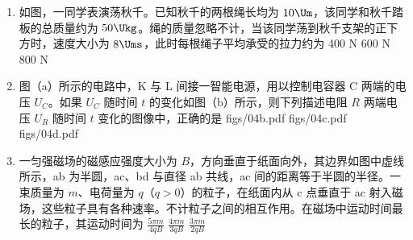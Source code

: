 \documentclass[\gkver]{gaokaozhenti}
\begin{document}
\begin{enumerate}
{故选 B。
}

\item
如图，一同学表演荡秋千。已知秋千的两根绳长均为 $10\Um$，该同学和秋千踏板的总质量约为 $50\Ukg$。绳的质量忽略不计，当该同学荡到秋千支架的正下方时，速度大小为 $8\Ums$，此时每根绳子平均承受的拉力约为
{400 N}
{600 N}
{800 N}

\item
图（a）所示的电路中，K 与 L 间接一智能电源，用以控制电容器 C 两端的电压 $U_{C}$。如果 $U_{C}$ 随时间 $t$ 的变化如图（b）所示，则下列描述电阻 $R$ 两端电压 $U_{R}$ 随时间 $t$ 变化的图像中，正确的是
\onepicture[w=11.00cm]{}
{figs/04b.pdf}
{figs/04c.pdf}
{figs/04d.pdf}

\item
一匀强磁场的磁感应强度大小为 $B$，方向垂直于纸面向外，其边界如图中虚线所示，ab 为半圆，ac、bd 与直径 ab 共线，ac 间的距离等于半圆的半径。一束质量为 $m$、电荷量为 $q$（$q>0$）的粒子，在纸面内从 c 点垂直于 ac 射入磁场，这些粒子具有各种速率。不计粒子之间的相互作用。在磁场中运动时间最长的粒子，其运动时间为
\onepicture[w=5.52cm]{}
{$\frac{5\pi m}{4qB}$}
{$\frac{4\pi m}{3qB}$}
{$\frac{3\pi m}{2qB}$}
\end{enumerate}
\end{document}
